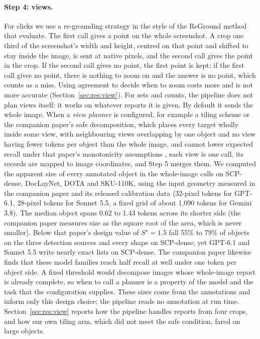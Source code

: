 \paragraph{Step 4: views.} For clicks we use a re-grounding strategy in the style of the ReGround method that \citet{li2025screenspotpro} evaluate. The first call gives a point on the whole screenshot. A crop one third of the screenshot's width and height, centred on that point and shifted to stay inside the image, is sent at native pixels, and the second call gives the point in the crop. If the second call gives no point, the first point is kept; if the first call gives no point, there is nothing to zoom on and the answer is no point, which counts as a miss. Using agreement to decide when to zoom costs more and is not more accurate (Section~\ref{sec:res:view}). For sets and counts, the pipeline does not plan views itself: it works on whatever reports it is given. By default it sends the whole image. When a \emph{view planner} is configured, for example a tiling scheme or the companion paper's safe decomposition, which places every target wholly inside some view, with neighbouring views overlapping by one object and no view having fewer tokens per object than the whole image, and cannot lower expected recall under that paper's monotonicity assumptions \citep{shi2026zoomin}, each view is one call, its records are mapped to image coordinates, and Step 5 merges them. We computed the apparent size of every annotated object in the whole-image calls on SCP-dense, DocLayNet, DOTA and SKU-110K, using the input geometry measured in the companion paper and its released calibration data (32-pixel tokens for GPT-6.1, 28-pixel tokens for Sonnet 5.5, a fixed grid of about 1,090 tokens for Gemini 3.8). The median object spans 0.62 to 1.43 tokens across its shorter side (the companion paper measures size as the square root of the area, which is never smaller). Below that paper's design value of $S^\star=1.5$ fall 55\% to 79\% of objects on the three detection sources and every shape on SCP-dense; yet GPT-6.1 and Sonnet 5.5 write nearly exact lists on SCP-dense. The companion paper likewise finds that these model families reach half recall at well under one token per object side. A fixed threshold would decompose images whose whole-image report is already complete, so when to call a planner is a property of the model and the task that the configuration supplies. These sizes come from the annotations and inform only this design choice; the pipeline reads no annotation at run time. Section~\ref{sec:res:view} reports how the pipeline handles reports from four crops, and how our own tiling arm, which did not meet the safe condition, fared on large objects.

